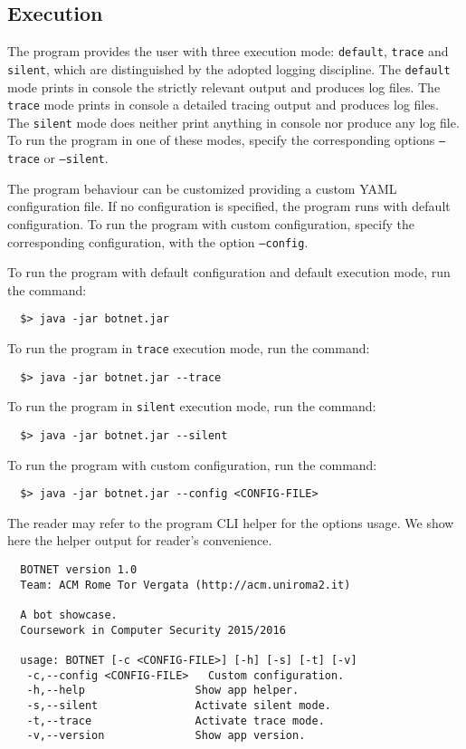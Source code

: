 \subsection{Execution}
\label{sec:execution}

The program provides the user with three execution mode: \texttt{default}, \texttt{trace} and \texttt{silent}, which are distinguished by the adopted logging discipline. The \texttt{default} mode prints in console the strictly relevant output and produces log files. The \texttt{trace} mode prints in console a detailed tracing output and produces log files. The \texttt{silent} mode does neither print anything in console nor produce any log file.
To run the program in one of these modes, specify the corresponding options \texttt{--trace} or \texttt{--silent}.

The program behaviour can be customized providing a custom YAML configuration file. If no configuration is specified, the program runs with default configuration. To run the program with custom configuration, specify the corresponding configuration, with the option \texttt{--config}.

To run the program with default configuration and default execution mode, run the command:

\begin{verbatim}
  $> java -jar botnet.jar
\end{verbatim}

To run the program in \texttt{trace} execution mode, run the command:

\begin{verbatim}
  $> java -jar botnet.jar --trace
\end{verbatim}

To run the program in \texttt{silent} execution mode, run the command:

\begin{verbatim}
  $> java -jar botnet.jar --silent
\end{verbatim}

To run the program with custom configuration, run the command:

\begin{verbatim}
  $> java -jar botnet.jar --config <CONFIG-FILE>
\end{verbatim}

The reader may refer to the program CLI helper for the options usage. We show here the helper output for reader's convenience.

\begin{verbatim}
  BOTNET version 1.0
  Team: ACM Rome Tor Vergata (http://acm.uniroma2.it)

  A bot showcase.
  Coursework in Computer Security 2015/2016

  usage: BOTNET [-c <CONFIG-FILE>] [-h] [-s] [-t] [-v]
   -c,--config <CONFIG-FILE>   Custom configuration.
   -h,--help                 Show app helper.
   -s,--silent               Activate silent mode.
   -t,--trace                Activate trace mode.
   -v,--version              Show app version.
\end{verbatim}


